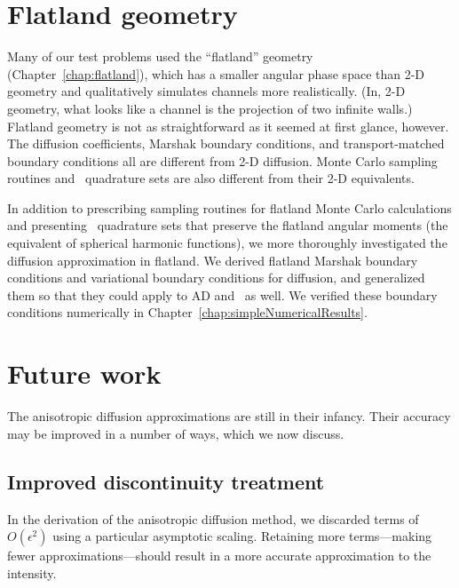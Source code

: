 \section{Flatland geometry}

Many of our test problems used the ``flatland'' geometry
(Chapter~\ref{chap:flatland}), which has a smaller angular phase space than 2-D
geometry and qualitatively simulates channels more realistically. (In, 2-D
geometry, what looks like a channel is the projection of two infinite walls.)
Flatland geometry is not as straightforward as it seemed at first glance,
however. The diffusion coefficients, Marshak boundary conditions, and
transport-matched boundary conditions all are different from 2-D diffusion.
Monte Carlo sampling routines and \SN\ quadrature sets are also different from
their 2-D equivalents.

In addition to prescribing sampling routines for flatland Monte Carlo
calculations and presenting \SN\ quadrature sets that preserve the flatland
angular moments (the equivalent of spherical harmonic functions), we more
thoroughly investigated the diffusion approximation in flatland. We derived
flatland Marshak boundary conditions and variational boundary conditions for
diffusion, and generalized them so that they could apply to AD and \APone\ as
well. We verified these boundary conditions numerically in
Chapter~\ref{chap:simpleNumericalResults}.

\section{Future work}

The anisotropic diffusion approximations are still in their infancy. Their
accuracy may be improved in a number of ways, which we now discuss.

\subsection{Improved discontinuity treatment}

In the derivation of the anisotropic diffusion method, we discarded
terms of $O(\epsilon^2)$ using a particular asymptotic scaling. Retaining more
terms---making fewer approximations---should result in a more accurate
approximation to the intensity.

